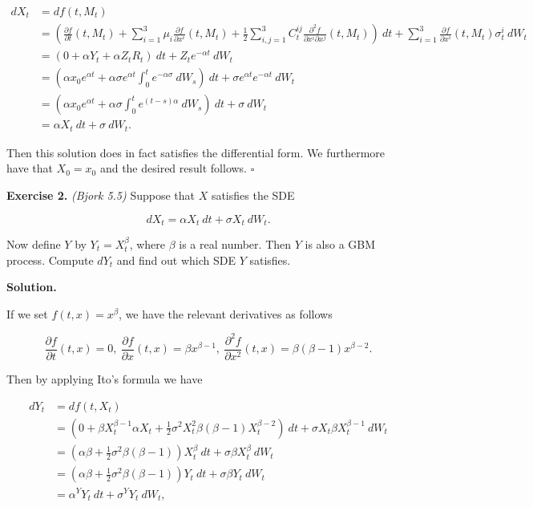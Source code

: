 \documentclass[
]{book}
\begin{document}
\begin{align*}
dX_t&=df(t,M_t)\\
&=\left(\frac{\partial f}{\partial t}(t,M_t)+\sum_{i=1}^3\mu_i \frac{\partial f}{\partial x^i}(t,M_t)+\frac{1}{2}\sum_{i,j=1}^3 C^{ij}_t\frac{\partial^2 f}{\partial x^i\partial x^j}(t,M_t)\right)\ dt + \sum_{i=1}^3 \frac{\partial f}{\partial x^i}(t,M_t) \sigma^i_t\ dW_t\\
&=\left(0+\alpha Y_t+\alpha Z_t R_t\right)\ dt + Z_te^{-\alpha t}\ dW_t\\
&=\left(\alpha x_0e^{\alpha t}+\alpha \sigma e^{\alpha t} \int_0^t e^{-\alpha \sigma}\ dW_s\right)\ dt + \sigma e^{\alpha t}e^{-\alpha t}\ dW_t\\
&=\left(\alpha x_0e^{\alpha t}+\alpha \sigma  \int_0^t e^{(t-s)\alpha }\ dW_s\right)\ dt + \sigma \ dW_t\\
&=\alpha X_t\ dt + \sigma \ dW_t.
\end{align*}

Then this solution does in fact satisfies the differential form. We furthermore have that \(X_0=x_0\) and the desired result follows. \(\square\)

\textbf{Exercise 2.} \emph{(Bjork 5.5)} Suppose that \(X\) satisfies the SDE

\[
dX_t = \alpha X_t\ dt + \sigma X_t\ dW_t.
\]

Now define \(Y\) by \(Y_t = X^\beta_t\), where \(\beta\) is a real number. Then \(Y\) is also a GBM process. Compute \(dY_t\) and find out which SDE \(Y\) satisfies.

\textbf{Solution.}

If we set \(f(t,x)=x^\beta\), we have the relevant derivatives as follows

\[
\frac{\partial f}{\partial t}(t,x)=0,\ \frac{\partial f}{\partial x}(t,x)=\beta x^{\beta -1},\ \frac{\partial^2 f}{\partial x^2}(t,x)=\beta (\beta -1) x^{\beta -2}.
\]

Then by applying Ito's formula we have

\begin{align*}
dY_t&=df(t,X_t)\\
&=\left(0 + \beta X_t^{\beta -1}\alpha X_t+\frac{1}{2}\sigma ^2X_t^2\beta (\beta -1) X_t^{\beta -2}\right)\ dt+\sigma X_t\beta X_t^{\beta -1} \ dW_t\\
&=\left(\alpha \beta+\frac{1}{2}\sigma ^2\beta (\beta -1)\right) X_t^{\beta}\ dt+\sigma \beta X_t^{\beta } \ dW_t\\
&=\left(\alpha \beta+\frac{1}{2}\sigma ^2\beta (\beta -1)\right) Y_t\ dt+\sigma \beta Y_t \ dW_t\\
&= \alpha^Y Y_t\ dt + \sigma^Y Y_t\ dW_t,
\end{align*}
\end{document}
